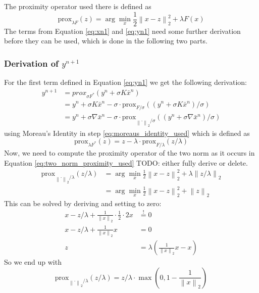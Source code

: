 \documentclass{paper}
\newcommand{\prox}{\text{prox}}
\newcommand{\twonorm}[1]{\left\lVert#1\right\rVert_2}
\begin{document}
The proximity operator used there is defined as 
\begin{equation}
	\prox_{\lambda F}(z) = \arg \min_x \frac{1}{2} \twonorm{x - z}^2 + \lambda F(x)
\end{equation}
The terms from Equation \eqref{eq:xn1} and \eqref{eq:yn1} need some further derivation
before they can be used, which is done in the following two parts.

\subsubsection*{Derivation of $y^{n+1}$}
For the first term defined in Equation \eqref{eq:yn1} we get the following derivation:
\begin{align}
	y^{n+1} &= prox_{\sigma F^*}(y^n + \sigma K \bar{x}^n) \\
			&= y^n + \sigma K \bar{x}^n - 
				\sigma \cdot \prox_{F / \sigma}((y^n + \sigma K \bar{x}^n) / \sigma) 
				\label{eq:moreaus_identity_used} \\
			&= y^n + \sigma \nabla \bar{x}^n - 
				\sigma \cdot \prox_{\twonorm{\cdot} / \sigma}((y^n + \sigma \nabla \bar{x}^n) / \sigma)
				\label{eq:two_norm_proximity_used}
\end{align}
using Moreau's Identity in step \eqref{eq:moreaus_identity_used} which is defined as
\begin{equation}
	\prox_{\lambda F^*}(z) = z - \lambda \cdot \prox_{F/ \lambda}(z / \lambda) 
\end{equation}
Now, we need to compute the proximity operator of the two norm as it 
occurs in Equation \eqref{eq:two_norm_proximity_used} TODO: either fully derive or delete.
\begin{align}
	\prox_{\twonorm{\cdot} / \lambda}(z / \lambda) &= \arg \min_x \frac{1}{2} \twonorm{x - z}^2 + \lambda \twonorm{z/\lambda} \\
	&= \arg \min_x \frac{1}{2} \twonorm{x - z}^2 + \twonorm{z}
\end{align}
This can be solved by deriving and setting to zero:
\begin{align*}
	x - z/\lambda + \frac{1}{\twonorm{x}} \cdot \frac{1}{2} \cdot 2x &\overset{!}{=} 0 \\
	x - z/\lambda + \frac{1}{\twonorm{x}} x &= 0 \\
	z &= \lambda(\frac{1}{\twonorm{x}} x - x)
\end{align*}
So we end up with
\begin{equation}
	\prox_{\twonorm{\cdot} / \lambda}(z / \lambda) =
	z / \lambda \cdot \max \left(0 , 1 - \frac{1}{\twonorm{x}} \right)
\end{equation}
\end{document}
